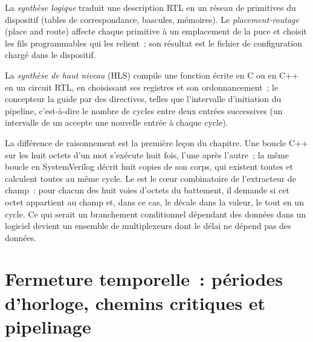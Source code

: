 \begin{definition}\label{def:nw:programmable-hardware-i-architecture-and-toolchain:synth}
La \emph{synthèse logique} traduit une description RTL en un réseau de primitives du dispositif (tables de correspondance,
bascules, mémoires). Le \emph{placement-routage} (place and route) affecte chaque primitive à un emplacement de la puce et choisit les
fils programmables qui les relient~; son résultat est le fichier de configuration chargé dans le dispositif.
\end{definition}

\begin{definition}\label{def:nw:programmable-hardware-i-architecture-and-toolchain:hls}
La \emph{synthèse de haut niveau} (HLS) compile une fonction écrite en C ou en C++ en un circuit RTL, en choisissant
ses registres et son ordonnancement~; le concepteur la guide par des directives, telles que l'intervalle d'initiation du pipeline, c'est-à-dire le nombre de cycles entre
deux entrées successives (un intervalle de un accepte une nouvelle entrée à chaque cycle).
\end{definition}

La différence de raisonnement est la première leçon du chapitre. Une boucle C++ sur les huit octets d'un mot s'exécute huit fois, l'une après
l'autre~; la même boucle en SystemVerilog décrit huit copies de son corps, qui existent toutes et calculent toutes au même cycle.
Le  est le cœur combinatoire de l'extracteur de champ~: pour chacun des
huit voies d'octets du battement, il demande si cet octet appartient au champ et, dans ce cas, le décale dans la valeur, le tout en un cycle. Ce qui serait
un branchement conditionnel dépendant des données dans un logiciel devient un ensemble de multiplexeurs dont le délai ne dépend pas des données.

\label{lst:nw:programmable-hardware-i-architecture-and-toolchain:field}

\section{Fermeture temporelle~: périodes d'horloge, chemins critiques et pipelinage}

